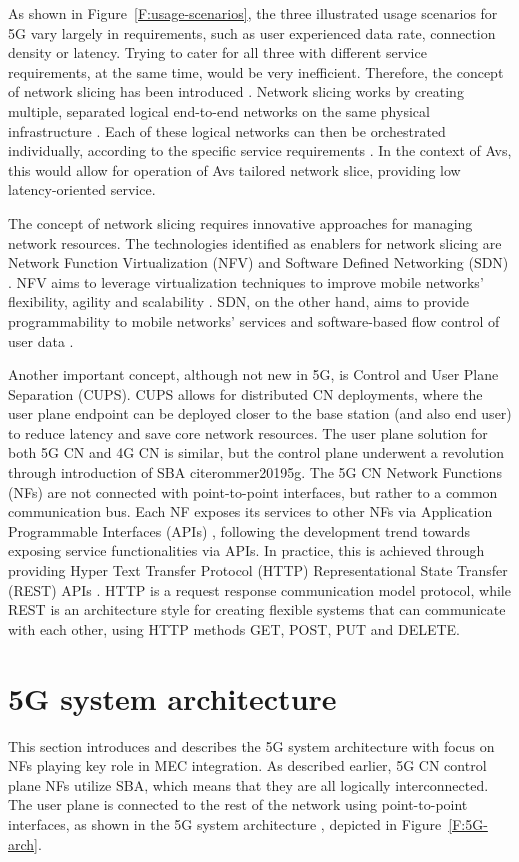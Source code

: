 \documentclass[12pt,a4paper,twoside]{report}
\begin{document}
As shown in Figure~\ref{F:usage-scenarios}, the three illustrated usage scenarios for 5G vary largely in requirements, such as user experienced data rate, connection density or latency. Trying to cater for all three with different service requirements, at the same time, would be very inefficient. Therefore, the concept of network slicing has been introduced \cite{yousaf2017nfv}. Network slicing works by creating multiple, separated logical end-to-end networks on the same physical infrastructure \cite{yousaf2017nfv}. Each of these logical networks can then be orchestrated individually, according to the specific service requirements \cite{yousaf2017nfv}. In the context of Avs, this would allow for operation of Avs tailored network slice, providing low latency-oriented service.

The concept of network slicing requires innovative approaches for managing network resources. The technologies identified as enablers for network slicing are Network Function Virtualization (NFV) and Software Defined Networking (SDN) \cite{yousaf2017nfv}. NFV aims to leverage virtualization techniques to improve mobile networks’ flexibility, agility and scalability \cite{yousaf2017nfv}. SDN, on the other hand, aims to provide programmability to mobile networks’ services and software-based flow control of user data \cite{yousaf2017nfv}. 
  
Another important concept, although not new in 5G, is Control and User Plane Separation (CUPS). CUPS allows for distributed CN deployments, where the user plane endpoint can be deployed closer to the base station (and also end user) to reduce latency and save core network resources. The user plane solution for both 5G CN and 4G CN is similar, but the control plane underwent a revolution through introduction of SBA cite{rommer20195g}. The 5G CN Network Functions (NFs) are not connected with point-to-point interfaces, but rather to a common communication bus. Each NF exposes its services to other NFs via Application Programmable Interfaces (APIs) \cite{rommer20195g}, following the development trend towards exposing service functionalities via APIs. In practice, this is achieved through providing Hyper Text Transfer Protocol (HTTP) Representational State Transfer (REST) APIs \cite{sabella-mec-sw-dev,rommer20195g}. HTTP is a request response communication model protocol, while REST is an architecture style for creating flexible systems that can communicate with each other, using HTTP methods GET, POST, PUT and DELETE.

\section{5G system architecture}
This section introduces and describes the 5G system architecture with focus on NFs playing key role in MEC integration. As described earlier, 5G CN control plane NFs utilize SBA, which means that they are all logically interconnected. The user plane is connected to the rest of the network using point-to-point interfaces, as shown in the 5G system architecture \cite{ETSI:TS:5G}, depicted in Figure~\ref{F:5G-arch}. 
\end{document}
